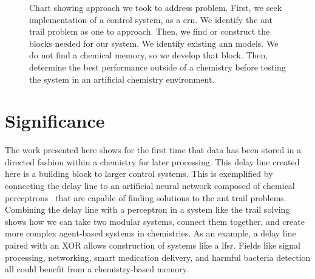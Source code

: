 \begin{figure}
\centering
{}

\caption[Approach Process]{Chart showing approach we took to address problem. First, we seek implementation of a control system, as a \gls{crn}. We identify the ant trail problem as one to approach. Then, we find or construct the blocks needed for our system. We identify existing \gls{ann} models. We do not find a chemical memory, so we develop that block. Then, determine the best performance outside of a chemistry before testing the system in an artificial chemistry environment. }
\label{fig:approach_process}
\end{figure}

\section{Significance}
The work presented here shows for the first time that data has been stored in a directed fashion within a chemistry for later processing. This delay line created here is a building block to larger control systems. This is exemplified by connecting the delay line to an artificial neural network composed of chemical perceptrons~\cite{Banda2013-zs} that are capable of finding solutions to the ant trail problems. Combining the delay line with a perceptron in a system like the trail solving shows how we can take two modular systems, connect them together, and create more complex agent-based systems in chemistries. As an example, a delay line paired with an XOR allows construction of systems like a \gls{lfsr}. Fields like signal processing, networking, smart medication delivery, and harmful bacteria detection all could benefit from a chemistry-based memory. 

